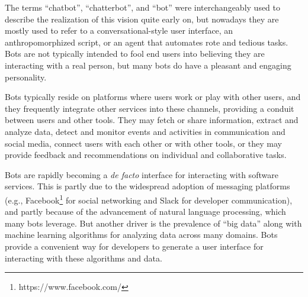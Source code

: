 \documentclass{sig-alternate}
\newcommand{\cp}[1]{\textcolor{red}{{\it [Cassie says: #1]}}}
\newcommand{\cp}[1]{}
\begin{document}
The terms ``chatbot'', ``chatterbot'', and ``bot'' were interchangeably used to describe the realization of this vision quite early on, but nowadays they are mostly used to refer to a conversational-style user interface, an anthropomorphized script, or an agent that automates rote and tedious tasks.
Bots are not typically intended to fool end users into believing they are interacting with a real person, but many bots do have a pleasant and engaging personality. 
 
Bots typically reside on platforms where users work or play with other users, and they frequently integrate other services into these channels, providing a conduit between users and other tools. 
They may fetch or share information, extract and analyze data, detect and monitor events and activities in communication and social media, connect users with each other or with other tools, or they may provide feedback and recommendations on individual and collaborative tasks. 

Bots are rapidly becoming a \emph{de facto} interface for interacting with software services. This is partly due to the widespread adoption of messaging platforms (e.g., Facebook\footnote{https://www.facebook.com/\label{Facebook}} for social networking and Slack for developer communication), and partly because of the advancement of natural language processing, which many bots leverage.
But another driver is the prevalence of ``big data'' along with machine learning algorithms for analyzing data across many domains.  Bots provide a convenient way for developers to generate a user interface for interacting with these algorithms and data. 

\end{document}
